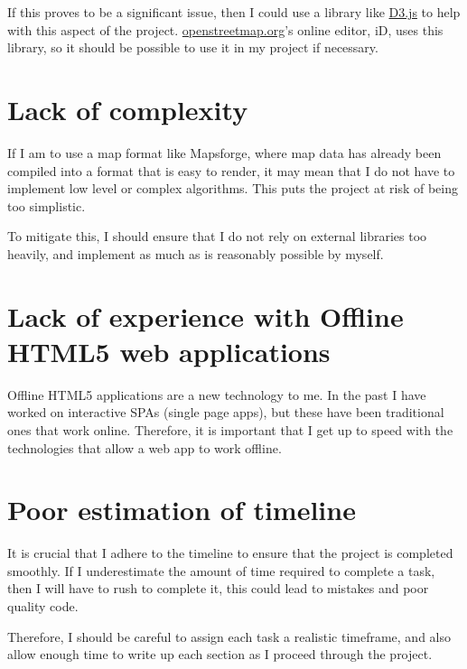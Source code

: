\documentclass[]{final_report}
\begin{document}
If this proves to be a significant issue, then I could use a library like \href{https://github.com/d3/d3-geo}{D3.js} to help with this aspect of the project. \href{https://openstreetmap.org}{openstreetmap.org}'s online editor, iD, uses this library, so it should be possible to use it in my project if necessary.

\section{Lack of complexity}

If I am to use a map format like Mapsforge, where map data has already been compiled into a format that is easy to render, it may mean that I do not have to implement low level or complex algorithms. This puts the project at risk of being too simplistic.

To mitigate this, I should ensure that I do not rely on external libraries too heavily, and implement as much as is reasonably possible by myself.

\section{Lack of experience with Offline HTML5 web applications}

Offline HTML5 applications are a new technology to me. In the past I have worked on interactive SPAs (single page apps), but these have been traditional ones that work online. Therefore, it is important that I get up to speed with the technologies that allow a web app to work offline.

\section{Poor estimation of timeline}

It is crucial that I adhere to the timeline to ensure that the project is completed smoothly. If I underestimate the amount of time required to complete a task, then I will have to rush to complete it, this could lead to mistakes and poor quality code.

Therefore, I should be careful to assign each task a realistic timeframe, and also allow enough time to write up each section as I proceed through the project.

\printbibliography{}\label{endpage}
\end{document}
